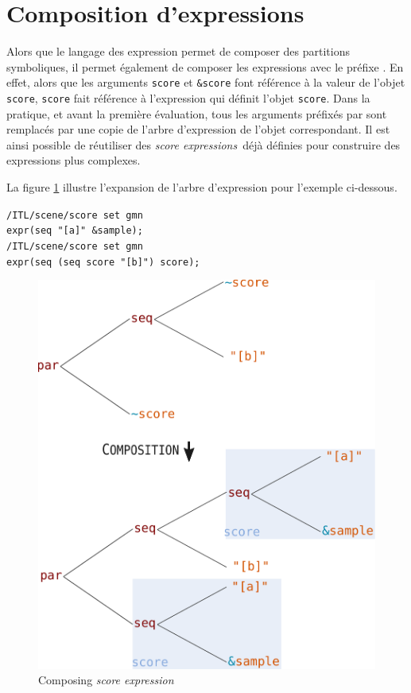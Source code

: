 \documentclass{article}
\newcommand{\OSC}[1]{\texttt{#1}}
\newcommand{\oper}[1]{\textcolor{figRed}{#1}}
\newcommand{\param}[1]{\textcolor{figOrange}{#1}}
\newcommand{\prefix}[1]{\textcolor{figBlue}{#1}}
\newcommand{\sExpr}{\emph{score expression}}
\newcommand{\sExprs}{\emph{score expressions}}
\newcommand{\lowTilde}{\texttildelow}
\newcommand{\tab}{\hspace*{4mm}}
\newcommand{\sample}	[1]			{\vspace{-0.2em}\begin{center}\colorbox{mygrey}{\begin{minipage}[t]{0.97\columnwidth} {\small \texttt{#1}}\end{minipage}}\end{center}}
\begin{document}
\section{Composition d'expressions}
\label{composingExpr}
Alors que le langage des expression permet de composer des partitions symboliques, il permet également de composer les expressions avec le préfixe  \OSC{\prefix{\lowTilde}}. En effet, alors que les arguments \OSC{\param{score}} et \OSC{\prefix{\&}\param{score}} font référence à la valeur de l'objet \OSC{score}, \OSC{\prefix{\lowTilde}\param{score}} fait référence à l'expression qui définit l'objet \OSC{score}. Dans la pratique, et avant la première évaluation, tous les arguments préfixés par \OSC{\prefix{\lowTilde}} sont remplacés par une copie de l'arbre d'expression de l'objet correspondant. Il est ainsi possible de réutiliser des \sExprs\ déjà définies pour construire des expressions plus complexes.

La figure \ref{fig:expandingTree} illustre l'expansion de l'arbre d'expression pour l'exemple ci-dessous.

\sample{/ITL/scene/score set gmn\\
\tab expr(\oper{seq} \param{"[a]"} \prefix{\&}\param{sample});\\
/ITL/scene/score set gmn  \\
\tab expr(\oper{seq} (\oper{seq} \prefix{\lowTilde}\param{score} \param{"[b]"}) \prefix{\lowTilde}\param{score});
}

\begin{figure}[th]
\centering
\includegraphics[width=0.9\columnwidth]{imgs/expandingTree}
\caption{Composing \sExpr
\label{fig:expandingTree}}
\end{figure}
\end{document}
